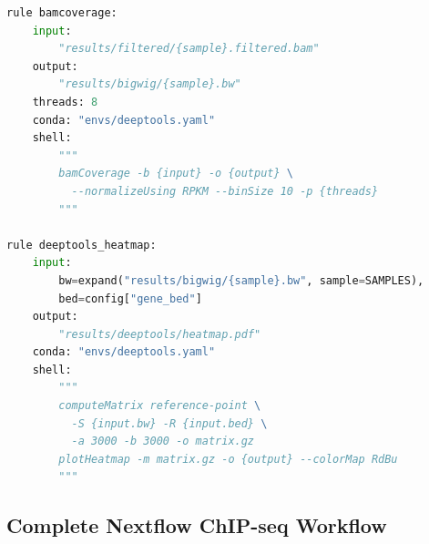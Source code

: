 \begin{lstlisting}[language=Python,caption={Snakemake ChIP-seq pipeline with input control.},label=lst:smk-chip]
rule bamcoverage:
    input:
        "results/filtered/{sample}.filtered.bam"
    output:
        "results/bigwig/{sample}.bw"
    threads: 8
    conda: "envs/deeptools.yaml"
    shell:
        """
        bamCoverage -b {input} -o {output} \
          --normalizeUsing RPKM --binSize 10 -p {threads}
        """

rule deeptools_heatmap:
    input:
        bw=expand("results/bigwig/{sample}.bw", sample=SAMPLES),
        bed=config["gene_bed"]
    output:
        "results/deeptools/heatmap.pdf"
    conda: "envs/deeptools.yaml"
    shell:
        """
        computeMatrix reference-point \
          -S {input.bw} -R {input.bed} \
          -a 3000 -b 3000 -o matrix.gz
        plotHeatmap -m matrix.gz -o {output} --colorMap RdBu
        """
\end{lstlisting}

\subsection{Complete Nextflow ChIP-seq Workflow}

